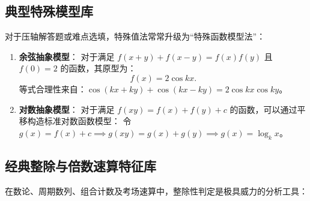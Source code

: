 \documentclass[12pt,a4paper]{ctexart}
\begin{document}
\subsection{典型特殊模型库}
对于压轴解答题或难点选填，特殊值法常常升级为“特殊函数模型法”：
\begin{enumerate}[label=\arabic*. , leftmargin=2em, itemsep=1.2em, topsep=0.2em]
  \item \textbf{余弦抽象模型}：
  对于满足 \(f(x+y)+f(x-y)=f(x)f(y)\) 且 \(f(0)=2\) 的函数，其原型为：
  \[
  f(x) = 2\cos kx.
  \]
  等式合理性来自：\(\cos(kx+ky) + \cos(kx-ky) = 2\cos kx \cos ky\)。
  \item \textbf{对数抽象模型}：
  对于满足 \(f(xy) = f(x) + f(y) + c\) 的函数，可以通过平移构造标准对数函数模型：
  令 \(g(x) = f(x) + c \implies g(xy) = g(x) + g(y) \implies g(x) = \log_k x\)。
\end{enumerate}

\subsection{经典整除与倍数速算特征库}
在数论、周期数列、组合计数及考场速算中，整除性判定是极具威力的分析工具：
\end{document}
